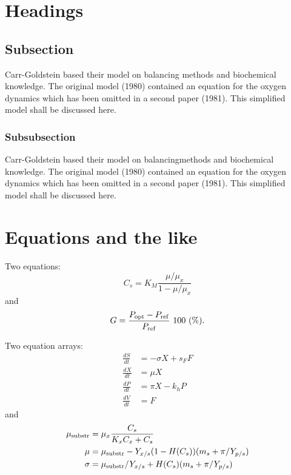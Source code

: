 \documentclass[cntp]{ipart}
\theoremstyle{plain}
\begin{document}
\section{Headings}

\subsection{Subsection}
Carr-Goldstein based their model on balancing methods and
biochemical know\-ledge. The original model (1980) contained an equation for the
oxygen dynamics which has been omitted in a second paper
(1981). This simplified model shall be discussed here.

\subsubsection{Subsubsection}
Carr-Goldstein
based their model on balancing\break methods and
biochemical know\-ledge. The original model (1980) contained an equation for the
oxygen dynamics which has been omitted in a second paper
(1981). This simplified model shall be discussed here.

\section{Equations and the like}

Two equations:
\begin{equation}
    C_{s}  =  K_{M} \frac{\mu/\mu_{x}}{1-\mu/\mu_{x}} \label{ccs}
\end{equation}
and
\begin{equation}
    G = \frac{P_{\rm opt} - P_{\rm ref}}{P_{\rm ref}} \mbox{\ }100 \mbox{\ }(\%).
\end{equation}

Two equation arrays:
\begin{align}
  \frac{dS}{dt} & =  - \sigma X + s_{F} F\\
  \frac{dX}{dt} & =    \mu    X\\
  \frac{dP}{dt} & =    \pi    X - k_{h} P\\
  \frac{dV}{dt} & =    F
\end{align}
and
\begin{align}
 \mu_{\rm substr} & =  \mu_{x} \frac{C_{s}}{K_{x}C_{x}+C_{s}}  \\
 \mu              & =  \mu_{\rm substr} - Y_{x/s}(1-H(C_{s}))(m_{s}+\pi /Y_{p/s}) \\
 \sigma           & =  \mu_{\rm substr}/Y_{x/s}+ H(C_{s}) (m_{s}+ \pi /Y_{p/s})
\end{align}
\end{document}

